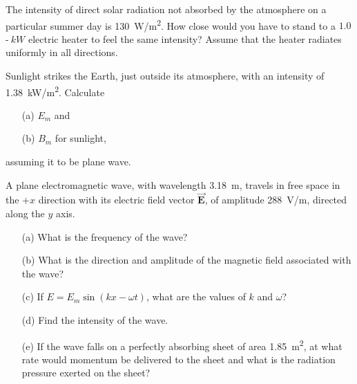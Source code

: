 \documentclass[12pt,letterpaper,boxed,cm]{hmcpset}
\newcommand{\pn}[1]{\left( #1 \right)}
\begin{document}

\begin{problem}[38-E25]
The intensity of direct solar radiation not absorbed by the atmosphere on a particular summer day is \SI{130}{W/m^2}. How close would you have to stand to a $1.0$-$\SI{}{kW}$ electric heater to feel the same intensity? Assume that the heater radiates uniformly in all directions.
\end{problem}
\begin{solution}
\end{solution}
\newpage

\begin{problem}[38-E28]
Sunlight strikes the Earth, just outside its atmosphere, with an intensity of \SI{1.38}{kW/m^2}. Calculate
\begin{enumerate}
	\item[(a)] $E_m$ and 
	\item[(b)] $B_m$ for sunlight, 
\end{enumerate}
assuming it to be plane wave.
\end{problem}
\begin{solution}
\end{solution}
\newpage

\begin{problem}[38-P13*]
A plane electromagnetic wave, with wavelength \SI{3.18}{m}, travels in free space in the $+x$ direction with its electric field vector $\vec{\mathbf{E}}$, of amplitude \SI{288}{V/m}, directed along the $y$ axis.
\begin{enumerate}
	\item[(a)] What is the frequency of the wave?
	\item[(b)] What is the direction and amplitude of the magnetic field associated with the wave?
	\item[(c)] If $E = E_m\sin\pn{kx-\omega t}$, what are the values of $k$ and $\omega$?
	\item[(d)] Find the intensity of the wave.
	\item[(e)] If the wave falls on a perfectly absorbing sheet of area \SI{1.85}{m^2}, at what rate would momentum be delivered to the sheet and what is the radiation pressure exerted on the sheet?
\end{enumerate}
\end{problem}
\begin{solution}
\end{solution}
\newpage
\end{document}
